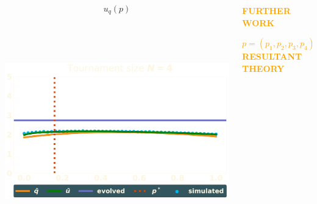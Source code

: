 \documentclass[usenames,dvipsnames,t]{beamer}
\begin{document}
\begin{columns}
\begin{column}{.7\linewidth}
\begin{columns}
\begin{column}{.5\linewidth}
\begin{center}
                \textbf{\[u_q(p)\]} \\
                 \\
                 \\
                 \\
                \includegraphics[width=.5\textwidth]{static/tournament}

            \end{center}
        \end{column}
    \end{columns}
    \end{column}
    \begin{column}{.25\linewidth}
        \begin{center}
            \vspace{-.08cm}
            \textcolor{orange}{\textbf{\Large{FURTHER WORK}}}
        \end{center}

        \begin{center}
            \vspace{.3cm}

            \textcolor{orange}{\small{\textbf{ \boldmath\(p=(p_1, p_2, p_3, p_4) \rightarrow\) RESULTANT THEORY}}}
        \end{center}
    \begin{center}
        
    \end{center}
            \vspace{2cm}


\end{column}
\end{columns}
\end{document}
